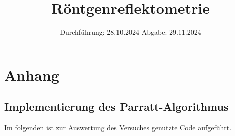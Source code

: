 

\subject{v44}
\title{Röntgenreflektometrie}
\date{%
  Durchführung: 28.10.2024
  \hspace{3em}
  Abgabe: 29.11.2024
}



\maketitle
\thispagestyle{empty}
\tableofcontents
\newpage

\DeclareSIUnit{}







\printbibliography{}

\appendix
\newpage

\section{Anhang}
\label{sec:Anhang}
\subsection{Implementierung des Parratt-Algorithmus}
Im folgenden ist zur Auswertung des Versuches genutzte Code aufgeführt.




